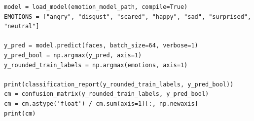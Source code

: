 \documentclass[runningheads,a4paper,11pt]{report}
\begin{document}
\begin{appendices}
\begin{lstlisting}
model = load_model(emotion_model_path, compile=True)
EMOTIONS = ["angry", "disgust", "scared", "happy", "sad", "surprised", "neutral"]

y_pred = model.predict(faces, batch_size=64, verbose=1)
y_pred_bool = np.argmax(y_pred, axis=1)
y_rounded_train_labels = np.argmax(emotions, axis=1)

print(classification_report(y_rounded_train_labels, y_pred_bool))
cm = confusion_matrix(y_rounded_train_labels, y_pred_bool)
cm = cm.astype('float') / cm.sum(axis=1)[:, np.newaxis]
print(cm)
\end{lstlisting}

\end{appendices}
\end{document}
